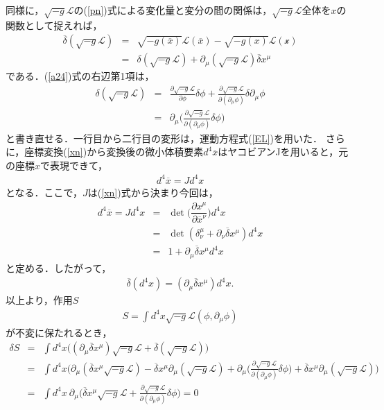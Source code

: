 同様に，$\sqrt{-g}\mathcal{L}$の(\ref{pn})式による変化量と変分の間の関係は，$\sqrt{-g}\mathcal{L}$全体を$x$の関数として捉えれば，
\begin{eqnarray}
\label{a24}
\overline{\delta}(\sqrt{-g}\mathcal{L})&=&\sqrt{-g(\overline{x})}\mathcal{L}(\overline{x})-\sqrt{-g(x)}\mathcal{L(x)} \nonumber \\
&=&\delta(\sqrt{-g}\mathcal{L})+\partial_{\mu}(\sqrt{-g}\mathcal{L})\overline{\delta}x^{\mu}
\end{eqnarray}
である．(\ref{a24})式の右辺第1項は，
\begin{eqnarray}
\label{a25}
\delta(\sqrt{-g}\mathcal{L})&=&\frac{\partial \sqrt{-g}\mathcal{L}}{\partial \phi}\delta \phi+\frac{\partial \sqrt{-g}\mathcal{L}}{\partial(\partial_{\mu} \phi)}\delta \partial_{\mu}\phi \nonumber \\
&=&\partial_{\mu}\biggl(\frac{\partial \sqrt{-g}\mathcal{L}}{\partial(\partial_{\mu} \phi)}\delta\phi\biggr)
\end{eqnarray}
と書き直せる．一行目から二行目の変形は，運動方程式(\ref{EL})を用いた．
さらに，座標変換(\ref{xn})から変換後の微小体積要素$d^4\overline{x}$はヤコビアンJを用いると，元の座標$x$で表現できて，
\begin{eqnarray}
d^4\overline{x}=Jd^4x
\end{eqnarray}
となる．ここで，$J$は(\ref{xn})式から決まり今回は，
\begin{eqnarray}
d^4\overline{x}=Jd^4x&=&\det\biggl(\dfrac{\partial x^{\mu}}{\partial \overline{x}^{\nu}}\biggr)d^4x  \nonumber \\
&=&\det(\delta^{\mu}_{\nu}+\partial_{\nu}\overline{\delta}x^{\mu})d^4x  \nonumber \\
&=&1+\partial_{\mu}\overline{\delta}x^{\mu}d^4x
\end{eqnarray}
と定める．したがって，
\begin{eqnarray}
\overline{\delta}(d^4x)=(\partial_{\mu}\overline{\delta}x^{\mu})d^4x.
\end{eqnarray}
以上より，作用$S$
\begin{eqnarray}
S=\int d^4x\sqrt{-g}\mathcal{L}(\phi,\partial_{\mu}\phi)
\end{eqnarray}
が不変に保たれるとき，
\begin{eqnarray}
\label{313}
\delta S&=&\int d^4x \biggl((\partial_{\mu}\overline{\delta}x^{\mu})\sqrt{-g}\mathcal{L}+\overline{\delta}(\sqrt{-g}\mathcal{L})\biggr) \nonumber \\
&=&\int d^4x \biggl(\partial_{\mu}(\overline{\delta}x^{\mu}\sqrt{-g}\mathcal{L})-\overline{\delta}x^{\mu}\partial_{\mu}(\sqrt{-g}\mathcal{L})
+\partial_{\mu}\biggl(\frac{\partial \sqrt{-g}\mathcal{L}}{\partial(\partial_{\mu} \phi)}\delta\phi\biggr)+\overline{\delta}x^{\mu}\partial_{\mu}(\sqrt{-g}\mathcal{L})\biggr) \nonumber \\
&=&\int d^4x \ \partial_{\mu}\biggl(\overline{\delta}x^{\mu}\sqrt{-g}\mathcal{L}+\frac{\partial \sqrt{-g}\mathcal{L}}{\partial(\partial_{\mu} \phi)}\delta\phi\biggr)=0
\end{eqnarray}
